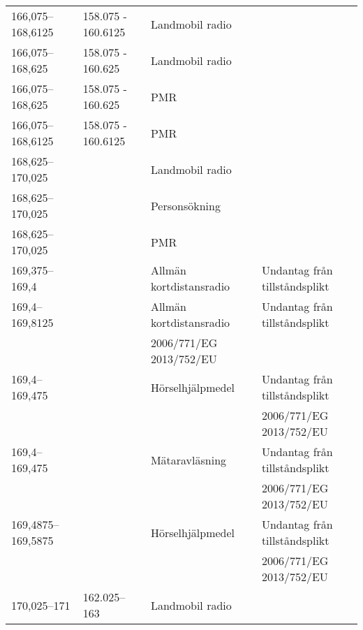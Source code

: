 \begin{landscape}
\begin{longtable}{llll}
	166,075--168,6125  & 158.075 - 160.6125 & Landmobil radio                       &                                \\
	166,075--168,625   & 158.075 - 160.625  & Landmobil radio                       &                                \\
	166,075--168,625   & 158.075 - 160.625  & PMR                                   &                                \\
	166,075--168,6125  & 158.075 - 160.6125 & PMR                                   &                                \\
	168,625--170,025   &                    & Landmobil radio                       &                                \\
	168,625--170,025   &                    & Personsökning                         &                                \\
	168,625--170,025   &                    & PMR                                   &                                \\
	169,375--169,4     &                    & Allmän kortdistansradio               & Undantag från tillståndsplikt  \\
	169,4--169,8125    &                    & Allmän kortdistansradio               & Undantag från tillståndsplikt  \\
	                   &                    & 2006/771/EG 2013/752/EU               &                                \\
	169,4--169,475     &                    & Hörselhjälpmedel                      & Undantag från tillståndsplikt  \\
	                   &                    &                                       & 2006/771/EG 2013/752/EU        \\
	169,4--169,475     &                    & Mätaravläsning                        & Undantag från tillståndsplikt  \\
	                   &                    &                                       & 2006/771/EG 2013/752/EU        \\
	169,4875--169,5875 &                    & Hörselhjälpmedel                      & Undantag från tillståndsplikt  \\
	                   &                    &                                       & 2006/771/EG 2013/752/EU        \\
	170,025--171       & 162.025--163       & Landmobil radio                       &                                \\

\end{longtable}
\end{landscape}
